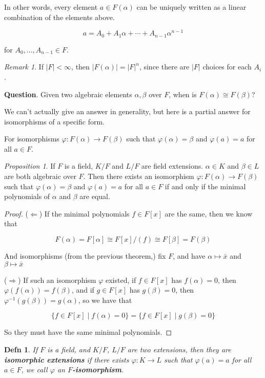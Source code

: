 \documentclass[12pt]{article}
\newtheorem{definition}{Defn}
\theoremstyle{remark}
\newtheorem{proposition}{Proposition}
\theoremstyle{remark}
\theoremstyle{remark}
\theoremstyle{remark}
\newtheorem*{remark}{Remark}
\theoremstyle{remark}
\begin{document}
In other words, every element $a \in F(\alpha)$ can be uniquely written as a linear
combination of the elements above.

\[
  a = A_0 + A_1 \alpha + \cdots + A_{n - 1} \alpha^{n - 1}
\]

for $A_0, \dots, A_{n - 1} \in F$.

\begin{remark}
  If $|F| < \infty$, then $|F(\alpha)| = |F|^n$, since there are $|F|$ choices
  for each $A_i$.
\end{remark}

{\bf Question}. Given two algebraic elements $\alpha, \beta$ over $F$, when is
$F(\alpha) \cong F(\beta)$?

We can't actually give an answer in generality, but here is a partial answer for
isomorphisms of a specific form.

For isomorphisms $\varphi: F(\alpha) \to F(\beta)$ such that $\varphi(\alpha) =
\beta$ and $\varphi(a) = a$ for all $a \in F$.

\begin{proposition}
  If $F$ is a field, $K / F$ and $L / F$ are field extensions. $\alpha \in K$
  and $\beta \in L$ are both algebraic over $F$. Then there exists an
  isomorphism $\varphi: F(\alpha) \to F(\beta)$ such that $\varphi(\alpha) =
  \beta$ and $\varphi(a) = a$ for all $a \in F$ if and only if the minimal
  polynomials of $\alpha$ and $\beta$ are equal.
\end{proposition}

\begin{proof}
  ($\Leftarrow$) If the minimal polynomials $f \in F[x]$ are the same, then
  we know that 

  \[
    F(\alpha) = F[\alpha] \cong F[x] / (f) \cong F[\beta] = F(\beta)
  \]

  And isomorphisms (from the previous theorem,) fix $F$, and have $\alpha
  \mapsto \bar x$ and $\beta \mapsto \bar x$

  ($\Rightarrow$) If such an isomorphism $\varphi$ existed, if $f \in F[x]$ has
  $f(\alpha) = 0$, then $\varphi(f(\alpha)) = f(\beta)$, and if $g \in F[x]$ has
  $g(\beta) = 0$, then $\varphi^{-1}(g(\beta)) = g(\alpha)$, so we have that

  \[
    \{f \in F[x] \mid f(\alpha) = 0 \} = \{ f \in F[x] \mid g(\beta) = 0 \}
  \]

  So they must have the same minimal polynomials.
\end{proof}

\begin{definition}
  If $F$ is a field, and $K / F$, $L / F$ are two extensions, then they are {\bf
  isomorphic extensions} if there exists $\varphi: K \to L$ such that
  $\varphi(a) = a$ for all $a \in F$, we call $\varphi$ an {\bf
  $F$-isomorphism}.
\end{definition}
\end{document}
